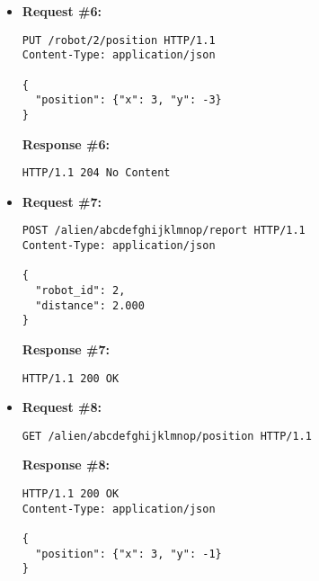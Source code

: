 \begin{itemize}
\item  %
\textbf{Request \#6:}
\begin{lstlisting}[xleftmargin=1pc,numbers=none]
PUT /robot/2/position HTTP/1.1
Content-Type: application/json

{
  "position": {"x": 3, "y": -3}
}
\end{lstlisting}
\textbf{Response \#6:}
\begin{lstlisting}[xleftmargin=1pc,numbers=none]
HTTP/1.1 204 No Content
\end{lstlisting}

\item  %
\textbf{Request \#7:}
\begin{lstlisting}[xleftmargin=1pc,numbers=none]
POST /alien/abcdefghijklmnop/report HTTP/1.1
Content-Type: application/json

{
  "robot_id": 2,
  "distance": 2.000
}
\end{lstlisting}
\textbf{Response \#7:}
\begin{lstlisting}[xleftmargin=1pc,numbers=none]
HTTP/1.1 200 OK
\end{lstlisting}

\item  %
\textbf{Request \#8:}
\begin{lstlisting}[xleftmargin=1pc,numbers=none]
GET /alien/abcdefghijklmnop/position HTTP/1.1
\end{lstlisting}
\textbf{Response \#8:}
\begin{lstlisting}[xleftmargin=1pc,numbers=none]
HTTP/1.1 200 OK
Content-Type: application/json

{
  "position": {"x": 3, "y": -1}
}
\end{lstlisting}

\end{itemize}
